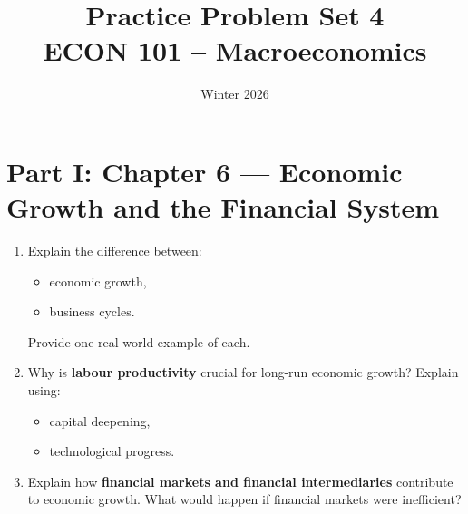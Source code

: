 \documentclass[12pt]{article}
\title{Practice Problem Set 4\\ \vspace{10pt} \large ECON 101 -- Macroeconomics}
\author{}
\date{ \vspace{-30pt} Winter 2026}
\begin{document}
\maketitle

\section*{Part I: Chapter 6 — Economic Growth and the Financial System}


\begin{enumerate}[label=\textbf{\arabic*.}]

\item Explain the difference between:
\begin{itemize}
    \item economic growth,
    \item business cycles.
\end{itemize}
Provide one real-world example of each.

\item Why is \textbf{labour productivity} crucial for long-run economic growth? 
Explain using:
\begin{itemize}
    \item capital deepening,
    \item technological progress.
\end{itemize}

\item Explain how \textbf{financial markets and financial intermediaries} contribute to economic growth. 
What would happen if financial markets were inefficient?

\end{enumerate}
\end{document}
